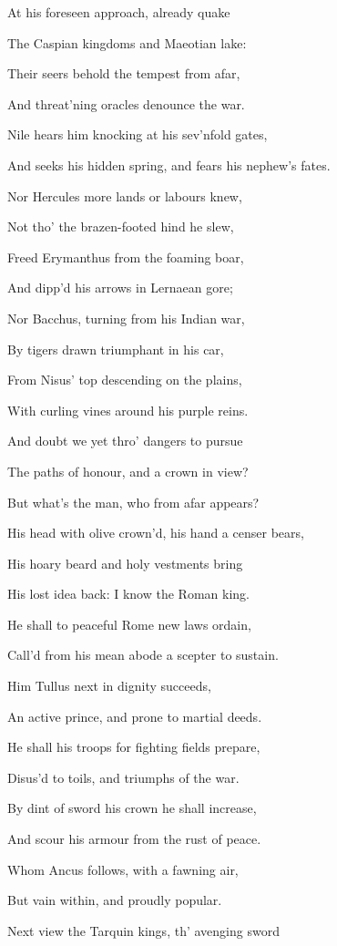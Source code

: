 At his foreseen approach, already quake

The Caspian kingdoms and Maeotian lake:

Their seers behold the tempest from afar,

And threat’ning oracles denounce the war.

Nile hears him knocking at his sev’nfold gates,

And seeks his hidden spring, and fears his nephew’s fates.

Nor Hercules more lands or labours knew,

Not tho’ the brazen-footed hind he slew,

Freed Erymanthus from the foaming boar,

And dipp’d his arrows in Lernaean gore;

Nor Bacchus, turning from his Indian war,

By tigers drawn triumphant in his car,

From Nisus’ top descending on the plains,

With curling vines around his purple reins.

And doubt we yet thro’ dangers to pursue

The paths of honour, and a crown in view?

But what’s the man, who from afar appears?

His head with olive crown’d, his hand a censer bears,

His hoary beard and holy vestments bring

His lost idea back: I know the Roman king.

He shall to peaceful Rome new laws ordain,

Call’d from his mean abode a scepter to sustain.

Him Tullus next in dignity succeeds,

An active prince, and prone to martial deeds.

He shall his troops for fighting fields prepare,

Disus’d to toils, and triumphs of the war.

By dint of sword his crown he shall increase,

And scour his armour from the rust of peace.

Whom Ancus follows, with a fawning air,

But vain within, and proudly popular.

Next view the Tarquin kings, th’ avenging sword

